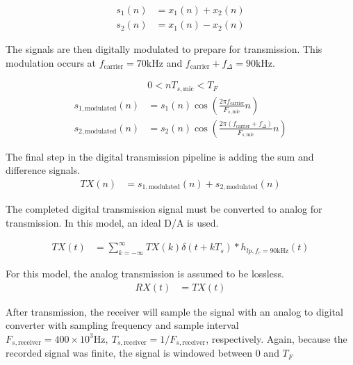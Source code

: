 \documentclass[journal]{IEEEtran}
\begin{document}
\begin{equation*}
    \begin{aligned}
        s_{1}( n) & =x_{1}( n) +x_{2}( n) \\
        s_{2}( n) & =x_{1}( n) -x_{2}( n)
    \end{aligned}
\end{equation*}

The signals are then digitally modulated to prepare for transmission.  This
modulation occurs at \(\displaystyle f_{\text{carrier}} =70\text{kHz}\) and
\(\displaystyle f_{\text{carrier}} +f_{\Delta } =90\text{kHz}\).


\begin{equation*}
    \begin{aligned}
                                   & 0< nT_{s,\text{mic}} < T_{F}                                                                  \\
        s_{1,\text{modulated}}( n) & =s_{1}( n)\cos\left(\frac{2\pi f_{\text{carrier}}}{F_{s,\text{mic}}} n\right) \\
        s_{2,\text{modulated}}( n) & =s_{2}( n)\cos\left(\frac{2\pi ( f_{\text{carrier}} +f_{\Delta })}{F_{s,\text{mic}}} n\right)
    \end{aligned}
\end{equation*}

The final step in the digital transmission pipeline is adding the sum and difference signals.
\begin{align*}
    TX( n) & =s_{1,\text{modulated}}( n) +s_{2,\text{modulated}}( n)
\end{align*}

The completed digital transmission signal must be converted to analog for
transmission. In this model, an ideal D/A is used.

\begin{equation*}
    \begin{aligned}
        TX( t) & =\sum _{k=-\infty }^{\infty } TX( k) \delta ( t+kT_{s}) *h_{lp,f_{c} =90\text{kHz}}( t)
    \end{aligned}
\end{equation*}

For this model, the analog transmission is assumed to be lossless.
\begin{align*}
    RX( t) & =TX( t)
\end{align*}

After transmission, the receiver will sample the signal with an analog to
digital converter with  sampling frequency and sample interval \(\displaystyle
F_{s,\text{receiver}} =400\times 10^{3}\text{Hz} ,\ T_{s,\text{receiver}}
=1/F_{s,\text{receiver}}\), respectively. Again, because the recorded signal was
finite, the signal is windowed  between 0 and \(\displaystyle T_{F}\)
\end{document}
